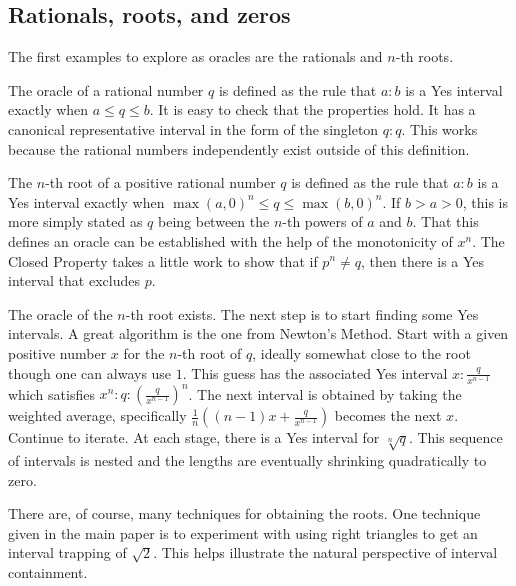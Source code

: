 \documentclass[12pt]{article}
\theoremstyle{remark}
\begin{document}
\subsection{Rationals, roots, and zeros}

The first examples to explore as oracles are the rationals and $n$-th roots. 

The oracle of a rational number $q$ is defined as the rule that $a:b$ is a Yes interval exactly when $a \leq q \leq b$. It is easy to check that the properties hold. It has a canonical representative interval in the form of the singleton $q:q$. This works because the rational numbers independently exist outside of this definition. 

The $n$-th root of a positive rational number $q$ is defined as the rule that $a:b$ is a Yes interval exactly when $\max(a, 0)^n \leq q \leq \max(b,0)^n$. If $b > a> 0$, this is more simply stated as $q$ being between the $n$-th powers of $a$ and $b$. That this defines an oracle can be established with the help of the monotonicity of $x^n$. The Closed Property takes a little work to show that if $p^n \neq q$, then there is a Yes interval that excludes $p$. 

The oracle of the $n$-th root exists. The next step is to start finding some Yes intervals. A great algorithm is the one from Newton's Method. Start with a given positive number $x$ for the $n$-th root of $q$, ideally somewhat close to the root though one can always use $1$. This guess has the associated Yes interval $x:\frac{q}{x^{n-1}}$ which satisfies $x^n : q : (\frac{q}{x^{n-1}})^n$. The next interval is obtained by taking the weighted average, specifically $\frac{1}{n}( (n-1) x + \frac{q}{x^{n-1}} )$ becomes the next $x$. Continue to iterate. At each stage, there is a Yes interval for $\sqrt[n]{q}$. This sequence of intervals is nested and the lengths are eventually shrinking quadratically to zero.  

There are, of course, many techniques for obtaining the roots. One technique given in the main paper is to experiment with using right triangles to get an interval trapping of $\sqrt{2}$. This helps illustrate the natural perspective of interval containment.  
\end{document}
